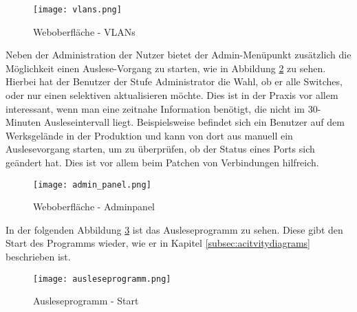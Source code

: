 \begin{figure}[H]
\centering
\texttt{[image: vlans.png]}
\caption[]{Weboberfläche - VLANs}
\label{fig:vlans}
\end{figure}

Neben der Administration der Nutzer bietet der Admin-Menüpunkt zusätzlich die Möglichkeit einen Auslese-Vorgang zu starten, wie in Abbildung \ref{fig:adminpanel} zu sehen.
Hierbei hat der Benutzer der Stufe Administrator die Wahl, ob er alle Switches, oder nur einen selektiven aktualisieren möchte.
Dies ist in der Praxis vor allem interessant, wenn man eine zeitnahe Information benötigt, die nicht im 30-Minuten Ausleseintervall liegt.
Beispielsweise befindet sich ein Benutzer auf dem Werksgelände in der Produktion und kann von dort aus manuell ein Auslesevorgang starten, um zu überprüfen, ob der Status eines Ports sich geändert hat.
Dies ist vor allem beim Patchen von Verbindungen hilfreich.

\begin{figure}[H]
\centering
\texttt{[image: admin\_panel.png]}
\caption[]{Weboberfläche - Adminpanel}
\label{fig:adminpanel}
\end{figure}

In der folgenden Abbildung \ref{fig:ausleseprogramm} ist das Ausleseprogramm zu sehen.
Diese gibt den Start des Programms wieder, wie er in Kapitel \ref{subsec:acitvitydiagrams} beschrieben ist.

\begin{figure}[H]
\centering
\texttt{[image: ausleseprogramm.png]}
\caption[]{Ausleseprogramm - Start}
\label{fig:ausleseprogramm}
\end{figure}








